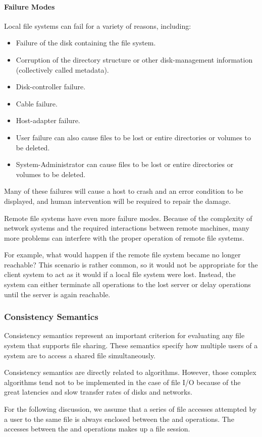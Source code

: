\paragraph{Failure Modes}\label{par:Failure_Modes}
Local file systems can fail for a variety of reasons, including:
\begin{itemize}[noitemsep]
\item Failure of the disk containing the file system.
\item Corruption of the directory structure or other disk-management information (collectively called metadata).
\item Disk-controller failure.
\item Cable failure.
\item Host-adapter failure.
\item User failure can also cause files to be lost or entire directories or volumes to be deleted.
\item System-Administrator can cause files to be lost or entire directories or volumes to be deleted.
\end{itemize}

Many of these failures will cause a host to crash and an error condition to be displayed, and human intervention will be required to repair the damage.

Remote file systems have even more failure modes.
Because of the complexity of network systems and the required interactions between remote machines, many more problems can interfere with the proper operation of remote file systems.

For example, what would happen if the remote file system became no longer reachable?
This scenario is rather common, so it would not be appropriate for the client system to act as it would if a local file system were lost.
Instead, the system can either terminate all operations to the lost server or delay operations until the server is again reachable.

\subsubsection{Consistency Semantics}\label{subsubsec:Consistency_Semantics}
Consistency semantics represent an important criterion for evaluating any file system that supports file sharing.
These semantics specify how multiple users of a system are to access a shared file simultaneously.

Consistency semantics are directly related to   algorithms.
However, those complex algorithms tend not to be implemented in the case of file I/O because of the great latencies and slow transfer rates of disks and networks.

For the following discussion, we assume that a series of file accesses attempted by a user to the same file is always enclosed between the  and  operations.
The accesses between the  and  operations makes up a file session.


